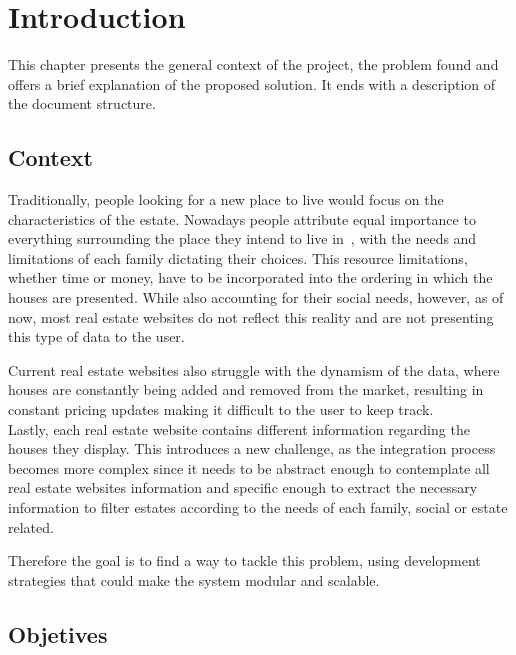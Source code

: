 
\chapter{Introduction}
\label{cha:introduction}

This chapter presents the general context of the project, the problem found and offers a brief explanation of the proposed solution. It ends with a description of the document structure.

\section{Context}
\label{s:context}

Traditionally, people looking for a new place to live would focus on the characteristics of the estate. Nowadays people attribute equal importance to everything surrounding the place they intend to live in~\cite{Montezuma2019}, with the needs and limitations of each family dictating their choices. This resource limitations, whether time or money, have to be incorporated into the ordering in which the houses are presented. While also accounting for their social needs, however, as of now, most real estate websites do not reflect this reality and are not presenting this type of data to the user.

Current real estate websites also struggle with the dynamism of the data, where houses are constantly being added and removed from the market, resulting in constant pricing updates making it difficult to the user to keep track. \\

Lastly, each real estate website contains different information regarding the houses they display. This introduces a new challenge, as the integration process becomes more complex since it needs to be abstract enough to contemplate all real estate websites information and specific enough to extract the necessary information to filter estates according to the needs of each family, social or estate related.

Therefore the goal is to find a way to tackle this problem, using development strategies that could make the system modular and scalable.

\section{Objetives}
\label{s:objectives}
    
